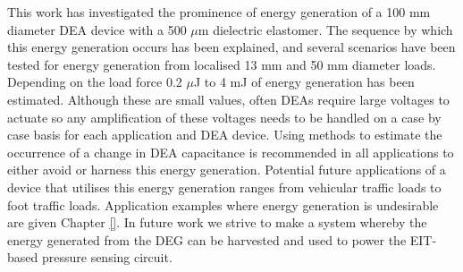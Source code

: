 This work has investigated the prominence of energy generation of a 100 mm diameter DEA device with a 500 $\mu$m dielectric elastomer. The sequence by which this energy generation occurs has been explained, and several scenarios have been tested for energy generation from localised 13 mm and 50 mm diameter loads. Depending on the load force 0.2 $\mu$J to 4 mJ of energy generation has been estimated. Although these are small values, often DEAs require large voltages to actuate so any amplification of these voltages needs to be handled on a case by case basis for each application and DEA device. Using methods to estimate the occurrence of a change in DEA capacitance is recommended in all applications to either avoid or harness this energy generation. Potential future applications of a device that utilises this energy generation ranges from vehicular traffic loads to foot traffic loads. Application examples where energy generation is undesirable are given Chapter \ref{}. In future work we strive to make a system whereby the energy generated from the DEG can be harvested and used to power the EIT-based pressure sensing circuit. 

\afterpage{\blankpage}